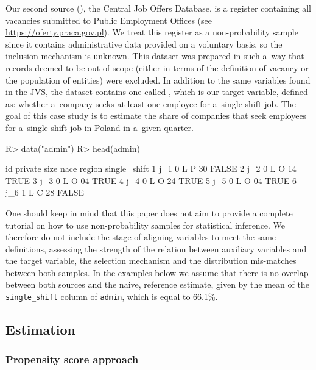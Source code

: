 \documentclass[
]{jss}
\begin{document}
Our second source (), the Central Job Offers Database, is a
register containing all vacancies submitted to Public Employment Offices
(see \url{https://oferty.praca.gov.pl}). We treat this register as a
non-probability sample since it contains administrative data provided on
a voluntary basis, so the inclusion mechanism is unknown. This dataset
was prepared in such a~way that records deemed to be out of scope
(either in terms of the definition of vacancy or the population of
entities) were excluded. In addition to the same variables found in the
JVS, the dataset contains one called , which is our
target variable, defined as: whether a~company seeks at least one
employee for a~single-shift job. The goal of this case study is to
estimate the share of companies that seek employees for a~single-shift
job in Poland in a~given quarter.

\begin{CodeChunk}
\begin{CodeInput}
R> data("admin")
R> head(admin)
\end{CodeInput}
\begin{CodeOutput}
   id private size nace region single_shift
1 j_1       0    L    P     30        FALSE
2 j_2       0    L    O     14         TRUE
3 j_3       0    L    O     04         TRUE
4 j_4       0    L    O     24         TRUE
5 j_5       0    L    O     04         TRUE
6 j_6       1    L    C     28        FALSE
\end{CodeOutput}
\end{CodeChunk}

One should keep in mind that this paper does not aim to provide a
complete tutorial on how to use non-probability samples for statistical
inference. We therefore do not include the stage of aligning variables
to meet the same definitions, assessing the strength of the relation
between auxiliary variables and the target variable, the selection
mechanism and the distribution mis-matches between both samples. In the
examples below we assume that there is no overlap between both sources
and the naive, reference estimate, given by the mean of the
\texttt{single\_shift} column of \texttt{admin}, which is equal to
66.1\%.

\subsection{Estimation}\label{estimation}

\subsubsection{Propensity score
approach}\label{propensity-score-approach}
\end{document}
